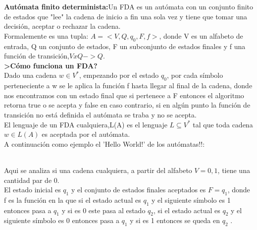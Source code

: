 \documentclass[12pt,a4paper]{article}
\begin{document}
\textbf{Aut\'omata finito determinista:}Un FDA es un aut\'omata con un conjunto finito de estados que "lee" la cadena de inicio a fin una sola vez y tiene que tomar una decisi\'on, aceptar o rechazar la cadena.\\
Formalemente es una tupla:
$A=<V,Q,q_{0},F,f>$, donde V es un alfabeto de entrada, Q un conjunto de estados, F un subconjunto de estados finales y f una funci\'on de transici\'on,$ VxQ->Q$.
\\
\textbf{>C\'omo funciona un FDA?}\\
Dado una cadena $ w \in V^{*}$, empezando por el estado $q_{0}$, por cada s\'imbolo perteneciente a w se le aplica la funci\'on f hasta llegar al final de la cadena, donde nos encontramos con un estado final que si pertenece a F entonces el algoritmo retorna true o se acepta y false en caso contrario, si en alg\'un punto la funci\'on de transici\'on no est\'a definida el aut\'omata se traba y no se acepta.\\
El lenguaje de un FDA cualquiera,L(A) es el lenguaje $L\subseteq V^{*}$ tal que toda cadena $w\in L(A)$ es aceptada por el autómata.\\
A continuaci\'on como ejemplo el 'Hello World!' de los aut\'omatas!!:\\
\\Aqui se analiza si una cadena cualquiera, a partir del alfabeto $V={0,1}$, tiene una cantidad par de 0.\\
El estado inicial es $q_{1}$ y el conjunto de estados finales aceptados es $F={q_{1}}$, donde f es la funci\'on en la que si el estado actual es $q_1$ y el siguiente s\'imbolo es 1 entonces pasa a $q_{1}$ y si es 0 este pasa al estado $q_2$, si el estado actual es $q_{2}$ y el siguiente s\'imbolo es 0 entonces pasa a $q_{1}$ y si es 1 entonces se queda en $q_{2}$ .  



 
\end{document}
